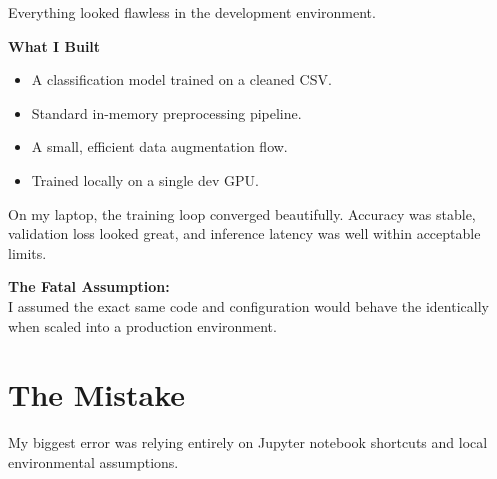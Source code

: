 \documentclass[11pt]{article}
\begin{document}
\vspace{0.3in}

{\large\color{brandgray}
Everything looked flawless in the development environment.
}

\vspace{0.15in}

\begin{darkbox}
{\large\textbf{What I Built}}

\vspace{0.05in}
\begin{itemize}[leftmargin=*, itemsep=0.08in, label={\color{brandblue}\textbullet}]
    \item A classification model trained on a cleaned CSV.
    \item Standard in-memory preprocessing pipeline.
    \item A small, efficient data augmentation flow.
    \item Trained locally on a single dev GPU.
\end{itemize}
\end{darkbox}

\vspace{0.2in}

On my laptop, the training loop converged beautifully. Accuracy was stable, validation loss looked great, and inference latency was well within acceptable limits.

\vspace{0.15in}

\begin{infobox}
\textbf{The Fatal Assumption:}\\
I assumed the exact same code and configuration would behave the identically when scaled into a production environment.
\end{infobox}

\vfill
\newpage

\section*{The Mistake}

\vspace{0.15in}

My biggest error was relying entirely on Jupyter notebook shortcuts and local environmental assumptions.

\vspace{0.2in}
\end{document}
